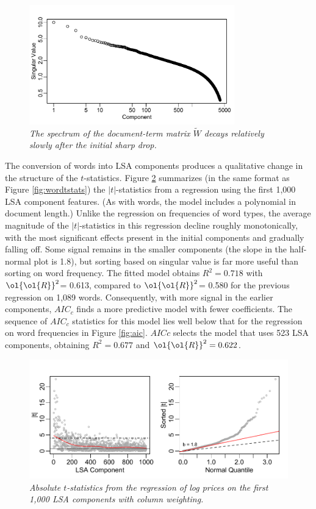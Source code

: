 \documentclass[12pt]{article}
\newcommand{\prs}{\mbox{$\ol{\ol{R}}^2$}}
\begin{document}
 \begin{figure}
 \caption{ 
 	\label{fig:spectrum}
	{\sl The spectrum of the document-term matrix $\tilde{W}$ decays relatively slowly 
	      after the initial sharp drop. }}

 \centerline{
 \vspace{0.1in}
 \includegraphics[width=3.5in]{figures/spectrum} }
 \vspace{0.2in}
 \end{figure}
   
The conversion of words into LSA components produces a qualitative change in the 
structure of the $t$-statistics.  Figure \ref{fig:lsatstats} summarizes (in the same format
 as Figure \ref{fig:wordtstats}) the $|t|$-statistics from a regression using the first 1,000 LSA 
 component features. (As with words, the model includes a polynomial in document length.) 
 Unlike the regression on frequencies of word types, the average magnitude of the $|t|$-statistics in this regression decline roughly monotonically, with the most significant effects present in the initial components and gradually falling off. Some signal remains in the smaller components (the slope in the half-normal plot is 1.8), but sorting based on singular value is far more useful than sorting on word frequency.  The fitted model obtains $R^2 = 0.718$ with \prs = 0.613, compared to \prs = 0.580 for the previous regression on 1,089 words.  Consequently, with more signal in the earlier components, $AIC_c$ finds a more predictive model with fewer coefficients.  The sequence of $AIC_c$ statistics for this model lies well below that for the regression on word frequencies in Figure \ref{fig:aic}.  $AICc$ selects the model that uses 523 LSA components, obtaining $R^2 = 0.677$ and $\prs  = 0.622$.  
 
\begin{figure}
\caption{  \label{fig:lsatstats}  
  {\sl Absolute $t$-statistics from the regression of log prices on the first 1,000 LSA components with column weighting.}  }
  \centerline{ \includegraphics[width=5in]{figures/lsa_tstats.pdf} }
\end{figure}
\end{document}

